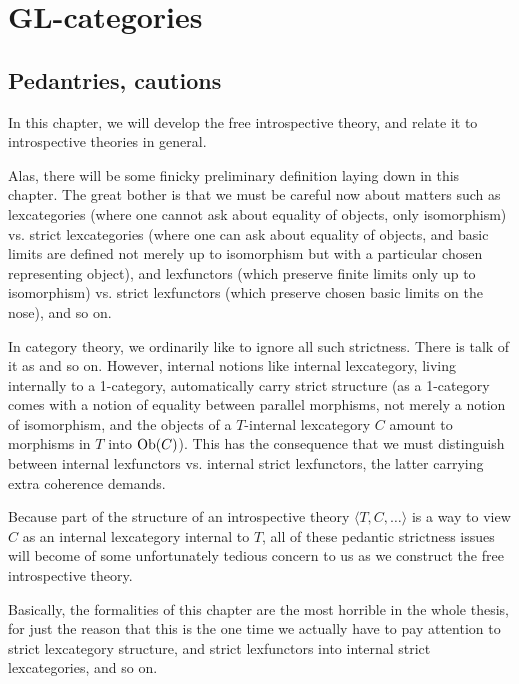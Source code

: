 \section{GL-categories}

\subsection{Pedantries, cautions}

In this chapter, we will develop the free introspective theory, and relate it to introspective theories in general. 

Alas, there will be some finicky preliminary definition laying down in this chapter. The great bother is that we must be careful now about matters such as lexcategories (where one cannot ask about equality of objects, only isomorphism) vs. strict lexcategories (where one can ask about equality of objects, and basic limits are defined not merely up to isomorphism but with a particular chosen representing object), and lexfunctors (which preserve finite limits only up to isomorphism) vs. strict lexfunctors (which preserve chosen basic limits on the nose), and so on.

In category theory, we ordinarily like to ignore all such strictness. There is talk of it as  and so on. However, internal notions like internal lexcategory, living internally to a 1-category, automatically carry strict structure (as a 1-category comes with a notion of equality between parallel morphisms, not merely a notion of isomorphism, and the objects of a $T$-internal lexcategory $C$ amount to morphisms in $T$ into $\operatorname{Ob}(C)$). This has the consequence that we must distinguish between internal lexfunctors vs. internal strict lexfunctors, the latter carrying extra coherence demands.

Because part of the structure of an introspective theory $\langle T, C, \ldots \rangle$ is a way to view $C$ as an internal lexcategory internal to $T$, all of these pedantic strictness issues will become of some unfortunately tedious concern to us as we construct the free introspective theory.

Basically, the formalities of this chapter are the most horrible in the whole thesis, for just the reason that this is the one time we actually have to pay attention to strict lexcategory structure, and strict lexfunctors into internal strict lexcategories, and so on.  

